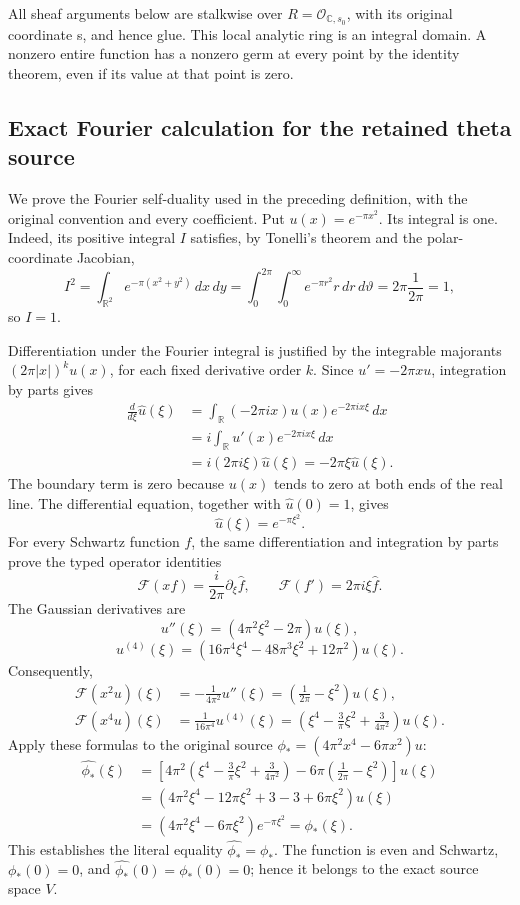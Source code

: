 All sheaf arguments below are stalkwise over \(R=\mathcal O_{\mathbb C,s_0}\), with its original coordinate s, and hence glue. This local analytic ring is an integral domain. A nonzero entire function has a nonzero germ at every point by the identity theorem, even if its value at that point is zero.

\subsection{Exact Fourier calculation for the retained theta source}
\label{lem:typed-route-fourier-phi-star}

We prove the Fourier self-duality used in the preceding definition, with
the original convention and every coefficient. Put
\(u(x)=e^{-\pi x^2}\). Its integral is one. Indeed, its positive integral
\(I\) satisfies, by Tonelli's theorem and the polar-coordinate Jacobian,
\[
I^2=\int_{\mathbb R^2}e^{-\pi(x^2+y^2)}\,dx\,dy
 =\int_0^{2\pi}\int_0^\infty e^{-\pi r^2}r\,dr\,d\vartheta
 =2\pi\frac1{2\pi}=1,
\]
so \(I=1\).

Differentiation under the Fourier integral is justified by the integrable
majorants \((2\pi|x|)^k u(x)\), for each fixed derivative order \(k\).
Since \(u'=-2\pi xu\), integration by parts gives
\[
\begin{aligned}
\frac{d}{d\xi}\widehat u(\xi)
 &=\int_{\mathbb R}(-2\pi ix)u(x)e^{-2\pi ix\xi}\,dx\\
 &=i\int_{\mathbb R}u'(x)e^{-2\pi ix\xi}\,dx\\
 &=i(2\pi i\xi)\widehat u(\xi)
 =-2\pi\xi\widehat u(\xi).
\end{aligned}
\]
The boundary term is zero because \(u(x)\) tends to zero at both
ends of the real line. The differential equation, together with
\(\widehat u(0)=1\), gives
\[
\widehat u(\xi)=e^{-\pi\xi^2}.
\]
For every Schwartz function \(f\), the same differentiation and integration
by parts prove the typed operator identities
\[
\mathcal F(xf)=\frac{i}{2\pi}\partial_\xi\widehat f,\qquad
\mathcal F(f')=2\pi i\xi\widehat f.
\]
The Gaussian derivatives are
\[
u''(\xi)=(4\pi^2\xi^2-2\pi)u(\xi),
\]
\[
u^{(4)}(\xi)=
(16\pi^4\xi^4-48\pi^3\xi^2+12\pi^2)u(\xi).
\]
Consequently,
\[
\begin{aligned}
\mathcal F(x^2u)(\xi)
 &=-\frac1{4\pi^2}u''(\xi)
   =\left(\frac1{2\pi}-\xi^2\right)u(\xi),\\
\mathcal F(x^4u)(\xi)
 &=\frac1{16\pi^4}u^{(4)}(\xi)
   =\left(\xi^4-\frac3\pi\xi^2+\frac3{4\pi^2}\right)u(\xi).
\end{aligned}
\]
Apply these formulas to the original source
\(\phi_*=(4\pi^2x^4-6\pi x^2)u\):
\[
\begin{aligned}
\widehat{\phi_*}(\xi)
 &=\left[
 4\pi^2\left(\xi^4-\frac3\pi\xi^2+\frac3{4\pi^2}\right)
 -6\pi\left(\frac1{2\pi}-\xi^2\right)\right]u(\xi)\\
 &=(4\pi^2\xi^4-12\pi\xi^2+3-3+6\pi\xi^2)u(\xi)\\
 &=(4\pi^2\xi^4-6\pi\xi^2)e^{-\pi\xi^2}
 =\phi_*(\xi).
\end{aligned}
\]
This establishes the literal equality
\(\widehat{\phi_*}=\phi_*\). The function is even and Schwartz,
\(\phi_*(0)=0\), and
\(\widehat{\phi_*}(0)=\phi_*(0)=0\); hence it belongs to the exact source
space \(V\).

